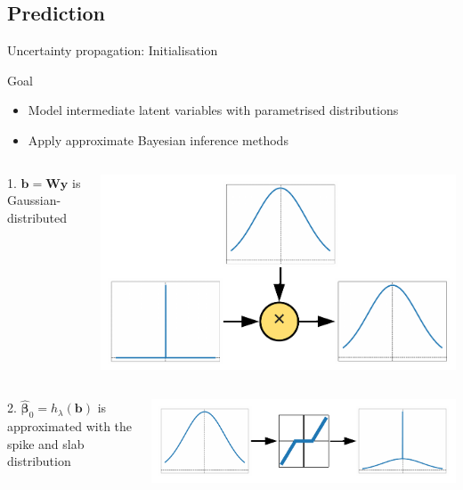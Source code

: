 \documentclass[9pt]{beamer}
\begin{document}
\subsection[Prediction]{Prediction}
  \begin{frame}{Uncertainty propagation: Initialisation}
     \begin{block}{Goal}
    \begin{itemize}
      \item[] Model intermediate latent variables with parametrised distributions
      \item[] Apply approximate Bayesian inference methods
    \end{itemize}
  \end{block}
    
      \begin{columns}
        \begin{column}{0.33\textwidth}
      1. \(\mathbf{b} = \mathbf{W}\mathbf{y}\) is Gaussian-distributed
    \end{column}
    \begin{column}{0.67\textwidth}
        \includegraphics[width=0.6\columnwidth]{graphics/gauss_delta.pdf}
      \end{column}
    \end{columns}
    \begin{columns}
      \begin{column}{0.33\textwidth}
      2. \(\widehat{\boldsymbol\beta}_{0} = h_\lambda(\mathbf{b})\) is approximated with the spike and slab distribution
    \end{column}
    \begin{column}{0.67\textwidth}
        \includegraphics[width=0.6\columnwidth]{graphics/spsl_propagation.pdf}
      \end{column}
    \end{columns}
\end{frame}
\end{document}
